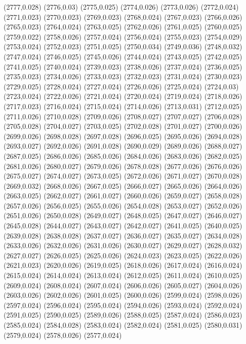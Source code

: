 (2777,0.028)
(2776,0.03)
(2775,0.025)
(2774,0.026)
(2773,0.026)
(2772,0.024)
(2771,0.023)
(2770,0.023)
(2769,0.023)
(2768,0.024)
(2767,0.023)
(2766,0.026)
(2765,0.023)
(2764,0.024)
(2763,0.025)
(2762,0.026)
(2761,0.025)
(2760,0.025)
(2759,0.022)
(2758,0.026)
(2757,0.024)
(2756,0.024)
(2755,0.023)
(2754,0.029)
(2753,0.024)
(2752,0.023)
(2751,0.025)
(2750,0.034)
(2749,0.036)
(2748,0.032)
(2747,0.024)
(2746,0.025)
(2745,0.026)
(2744,0.024)
(2743,0.025)
(2742,0.025)
(2741,0.025)
(2740,0.024)
(2739,0.023)
(2738,0.026)
(2737,0.024)
(2736,0.025)
(2735,0.023)
(2734,0.026)
(2733,0.023)
(2732,0.023)
(2731,0.024)
(2730,0.023)
(2729,0.025)
(2728,0.024)
(2727,0.024)
(2726,0.026)
(2725,0.024)
(2724,0.03)
(2723,0.024)
(2722,0.026)
(2721,0.024)
(2720,0.024)
(2719,0.024)
(2718,0.026)
(2717,0.023)
(2716,0.024)
(2715,0.024)
(2714,0.026)
(2713,0.031)
(2712,0.025)
(2711,0.026)
(2710,0.028)
(2709,0.026)
(2708,0.027)
(2707,0.027)
(2706,0.028)
(2705,0.028)
(2704,0.027)
(2703,0.025)
(2702,0.028)
(2701,0.027)
(2700,0.026)
(2699,0.026)
(2698,0.028)
(2697,0.028)
(2696,0.025)
(2695,0.026)
(2694,0.028)
(2693,0.027)
(2692,0.026)
(2691,0.028)
(2690,0.029)
(2689,0.026)
(2688,0.027)
(2687,0.025)
(2686,0.026)
(2685,0.026)
(2684,0.026)
(2683,0.026)
(2682,0.025)
(2681,0.026)
(2680,0.027)
(2679,0.026)
(2678,0.028)
(2677,0.026)
(2676,0.026)
(2675,0.027)
(2674,0.027)
(2673,0.025)
(2672,0.026)
(2671,0.027)
(2670,0.028)
(2669,0.032)
(2668,0.026)
(2667,0.025)
(2666,0.027)
(2665,0.026)
(2664,0.026)
(2663,0.025)
(2662,0.027)
(2661,0.027)
(2660,0.026)
(2659,0.027)
(2658,0.028)
(2657,0.026)
(2656,0.025)
(2655,0.026)
(2654,0.028)
(2653,0.027)
(2652,0.026)
(2651,0.026)
(2650,0.028)
(2649,0.027)
(2648,0.025)
(2647,0.027)
(2646,0.027)
(2645,0.028)
(2644,0.027)
(2643,0.027)
(2642,0.027)
(2641,0.025)
(2640,0.025)
(2639,0.028)
(2638,0.028)
(2637,0.027)
(2636,0.027)
(2635,0.027)
(2634,0.028)
(2633,0.026)
(2632,0.026)
(2631,0.026)
(2630,0.027)
(2629,0.027)
(2628,0.032)
(2627,0.027)
(2626,0.025)
(2625,0.026)
(2624,0.023)
(2623,0.025)
(2622,0.026)
(2621,0.023)
(2620,0.026)
(2619,0.025)
(2618,0.026)
(2617,0.024)
(2616,0.024)
(2615,0.024)
(2614,0.024)
(2613,0.024)
(2612,0.025)
(2611,0.024)
(2610,0.025)
(2609,0.024)
(2608,0.024)
(2607,0.024)
(2606,0.026)
(2605,0.027)
(2604,0.026)
(2603,0.026)
(2602,0.026)
(2601,0.025)
(2600,0.026)
(2599,0.024)
(2598,0.026)
(2597,0.024)
(2596,0.024)
(2595,0.024)
(2594,0.026)
(2593,0.024)
(2592,0.024)
(2591,0.025)
(2590,0.025)
(2589,0.026)
(2588,0.025)
(2587,0.024)
(2586,0.023)
(2585,0.024)
(2584,0.028)
(2583,0.024)
(2582,0.024)
(2581,0.025)
(2580,0.031)
(2579,0.024)
(2578,0.026)
(2577,0.024)

